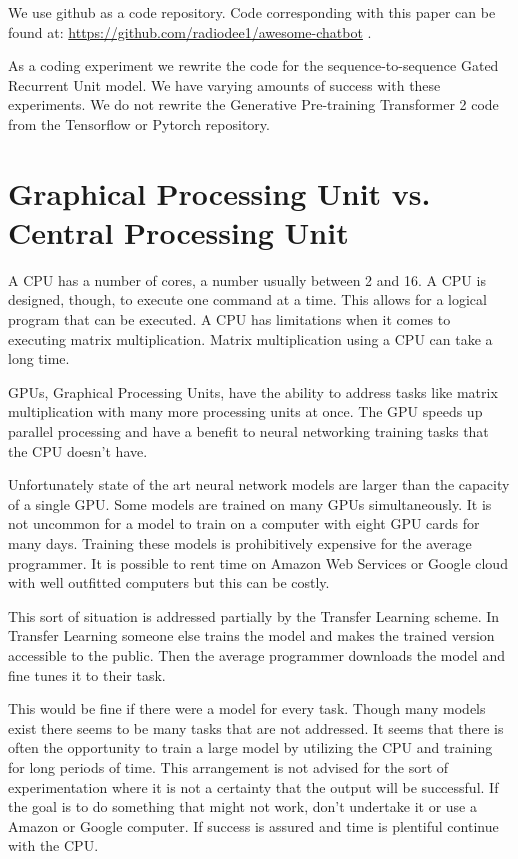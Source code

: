 We use github as a code repository. Code corresponding with this paper can be found at: \href{https://github.com/radiodee1/awesome-chatbot}{https://github.com/radiodee1/awesome-chatbot}
. 

As a coding experiment we rewrite the code for the sequence-to-sequence Gated Recurrent Unit model. We have varying amounts of success with these experiments. We do not rewrite the Generative Pre-training Transformer 2 code from the Tensorflow or Pytorch repository.

\section{Graphical Processing Unit vs. Central Processing Unit}

A CPU has a number of cores, a number usually between 2 and 16. A CPU is designed, though, to execute one command at a time. This allows for a logical program that can be executed. A CPU has limitations when it comes to executing matrix multiplication. Matrix multiplication using a CPU can take a long time.

GPUs, Graphical Processing Units, have the ability to address tasks like matrix multiplication with many more processing units at once. The GPU speeds up parallel processing and have a benefit to neural networking training tasks that the CPU doesn't have.

Unfortunately state of the art neural network models are larger than the capacity of a single GPU. Some models are trained on many GPUs simultaneously. It is not uncommon for a model to train on a computer with eight GPU cards for many days. Training these models is prohibitively expensive for the average programmer. It is possible to rent time on Amazon Web Services or Google cloud with well outfitted computers but this can be costly.

This sort of situation is addressed partially by the Transfer Learning scheme. In Transfer Learning someone else trains the model and makes the trained version accessible to the public. Then the average programmer downloads the model and fine tunes it to their task.

This would be fine if there were a model for every task. Though many models exist there seems to be many tasks that are not addressed. It seems that there is often the opportunity to train a large model by utilizing the CPU and training for long periods of time. This arrangement is not advised for the sort of experimentation where it is not a certainty that the output will be successful. If the goal is to do something that might not work, don't undertake it or use a Amazon or Google computer. If success is assured and time is plentiful continue with the CPU.

